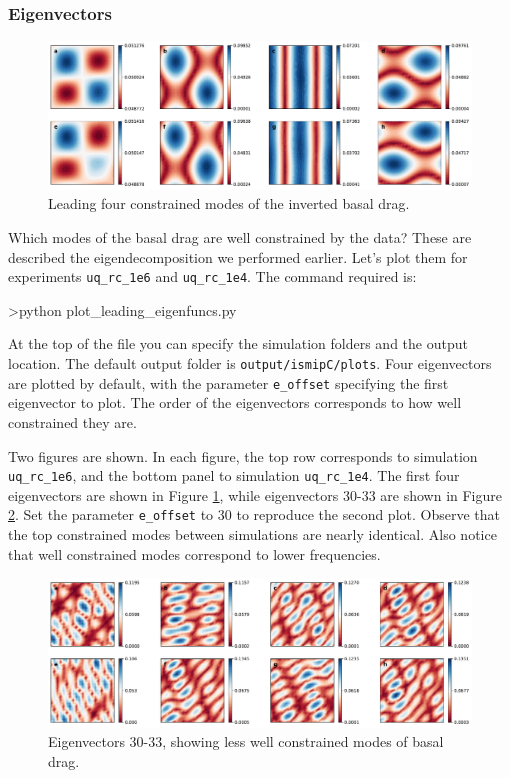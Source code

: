 \documentclass[11pt, reqno, nocenter]{article}
\begin{document}
\subsubsection{Eigenvectors}

\begin{figure}[!htbp]
  \centering
  \includegraphics[width=13cm]{./figures/leading_eigenvectors_0.pdf}
  \caption[IsmipC Basal Drag Leading Eigenvectors.]{Leading four constrained modes of the inverted basal drag.}
      \label{fig:leading_eigenvectors_0}
\end{figure}


Which modes of the basal drag are well constrained by the data? These are described the eigendecomposition we performed earlier. Let's plot them for experiments {\tt uq\_rc\_1e6} and {\tt uq\_rc\_1e4}. The command required is:

\begin{spverbatim}
>python plot_leading_eigenfuncs.py
\end{spverbatim}

At the top of the file you can specify the simulation folders and the output location. The default output folder is {\tt output/ismipC/plots}. Four eigenvectors are plotted by default, with the parameter {\tt e\_offset} specifying the first eigenvector to plot. The order of the eigenvectors corresponds to how well constrained they are. 

Two figures are shown. In each figure, the top row corresponds to simulation {\tt uq\_rc\_1e6}, and the bottom panel to simulation {\tt uq\_rc\_1e4}. The first four eigenvectors are shown in Figure \ref{fig:leading_eigenvectors_0}, while eigenvectors 30-33 are shown in Figure \ref{fig:leading_eigenvectors_30}. Set the parameter {\tt e\_offset} to 30 to reproduce the second plot.  Observe that the top constrained modes between simulations are nearly identical. Also notice that well constrained modes correspond to lower frequencies.

\begin{figure}[!htbp]
  \centering
  \includegraphics[width=13cm]{./figures/leading_eigenvectors_30.pdf}
  \caption[IsmipC Basal Drag Eigenvectors 30-33.]{Eigenvectors 30-33, showing less well constrained modes of basal drag. }
      \label{fig:leading_eigenvectors_30}
\end{figure}
\end{document}
